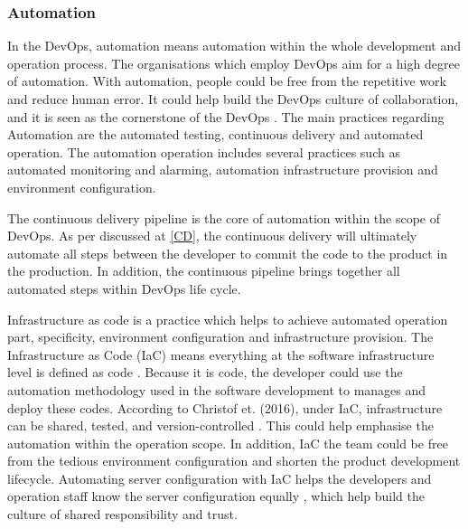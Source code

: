 \subsubsection[]{Automation}
In the DevOps, automation means 
automation within the whole development and operation process. The organisations which employ DevOps aim for a high degree of automation\cite{erich2017qualitative}.
With automation, people could be free from the repetitive work and reduce human error. It could help build the DevOps culture of collaboration, and it is seen as the cornerstone of the DevOps \cite{DevOpsCu76:online}.
The main practices regarding Automation are the automated testing, continuous delivery and automated operation. The automation operation includes several practices such as automated monitoring and alarming, automation infrastructure provision and environment configuration.
\par
The continuous delivery pipeline is the core of automation within the scope of DevOps. As per discussed at \ref{CD}, the continuous delivery will ultimately automate all steps between the developer to commit the code to the product in the production. In addition, the continuous pipeline brings together all automated steps within DevOps life cycle.
\par
\label{iasc}
Infrastructure as code is a practice which helps to achieve automated operation part, specificity, environment configuration and infrastructure provision. The Infrastructure as Code (IaC) means everything at the software infrastructure level is defined as code \cite{artac2017devops}. Because it is code, the developer could use the automation methodology used in the software development to manages and deploy these codes. According to Christof et. (2016), under IaC, infrastructure can be shared, tested, and version-controlled \cite{ebert2016devops}. This could help emphasise the automation within the operation scope. In addition, IaC the team could be free from the tedious environment configuration and shorten the product development lifecycle. Automating server configuration with IaC helps the developers and operation staff know the server configuration equally \cite{DevOpsCu76:online}, which help build the culture of shared responsibility and trust.
